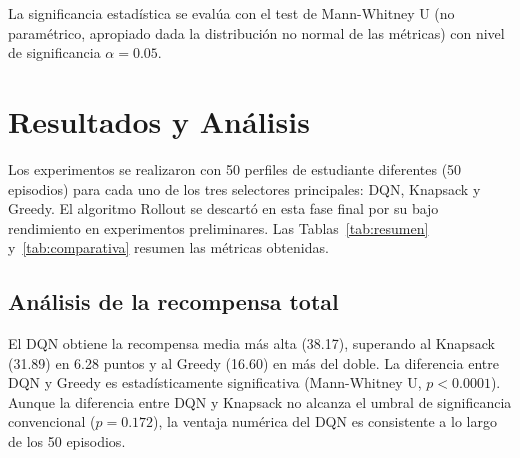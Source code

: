 \documentclass[12pt, a4paper]{article}
\begin{document}
La significancia estadística se evalúa con el test de Mann-Whitney U (no
paramétrico, apropiado dada la distribución no normal de las métricas)
con nivel de significancia $\alpha = 0.05$.

\section{Resultados y Análisis}

Los experimentos se realizaron con 50 perfiles de estudiante diferentes (50
episodios) para cada uno de los tres selectores principales: DQN, Knapsack y
Greedy. El algoritmo Rollout se descartó en esta fase final por su bajo
rendimiento en experimentos preliminares. Las Tablas~\ref{tab:resumen}
y~\ref{tab:comparativa} resumen las métricas obtenidas.

\begin{table}[H]
\centering
\caption{Resultados agregados: DQN, Knapsack y Greedy (50 episodios cada uno)}
\label{tab:resumen}
\end{table}

\subsection{Análisis de la recompensa total}

El DQN obtiene la recompensa media más alta (38.17), superando al Knapsack
(31.89) en 6.28 puntos y al Greedy (16.60) en más del doble. La diferencia
entre DQN y Greedy es estadísticamente significativa (Mann-Whitney U,
$p < 0.0001$). Aunque la diferencia entre DQN y Knapsack no alcanza el umbral
de significancia convencional ($p = 0.172$), la ventaja numérica del DQN es
consistente a lo largo de los 50 episodios.
\end{document}
